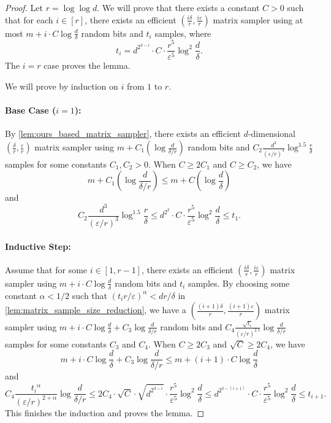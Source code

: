 \documentclass[10pt,a4paper]{article}
\newcommand{\eps}{\varepsilon}
\newcommand{\1}{\mathbbm{1}}
\newcommand{\tuple}[1]{\left(#1\right)}
\begin{document}
    \begin{proof}
    Let $r = \log\log d$.
    We will prove that there exists a constant $C > 0$ such that for each $i \in [r]$, there exists an efficient $\left( \frac{i \delta}{r}, \frac{i \varepsilon}{r}\right)$ matrix sampler using at most $m + i \cdot C \log\frac{d}{\delta}$ random bits and $t_i$ samples, where
    \[
        t_i = d^{2^{3-i}} \cdot C \cdot \frac{r^5}{\eps^5} \log^2\frac{d}{\delta}.
    \]
    The $i = r$ case proves the lemma. 

    We will prove by induction on $i$ from $1$ to $r$.
    \paragraph{Base Case ($i = 1$):}
    By \cref{lem:ours_based_matrix_sampler}, there exists an efficient $d$-dimensional $(\frac{\delta}{r}, \frac{\varepsilon}{r})$ matrix sampler using $m + C_1( \log\frac{d}{\delta/r})$ random bits and $C_2\frac{d^3}{(\eps/r)^3}\log^{1.5} \frac{r}{\delta}$ samples for some constants $C_1, C_2 > 0$. When $C \ge 2C_1$ and $C \ge C_2$, we have \[
        m + C_1\tuple{\log\frac{d}{\delta/r}} \le m + C\left( \log\frac{d}{\delta} \right)
    \]
         and
    \[
    C_2\frac{d^3}{(\eps/r)^3}\log^{1.5} \frac{r}{\delta} \le d^{2^{2}} \cdot C \cdot \frac{r^5}{\eps^5} \log^2\frac{d}{\delta} \le t_1.
    \]
 
    
    \paragraph{Inductive Step:}
    Assume that for some $i \in [1, r-1]$, there exists an efficient $\left( \frac{i \delta}{r}, \frac{i \varepsilon}{r}\right)$ matrix sampler using $m + i \cdot C\log\frac{d}{\delta}$ random bits and $t_i$ samples.
    By choosing some constant $\alpha < 1/2$ such that $(t_i r / \eps)^\alpha < d r / \delta$ in \cref{lem:matrix_sample_size_reduction}, we have a $\left( \frac{(i+1) \delta}{r}, \frac{(i+1) \varepsilon}{r}\right)$ matrix sampler using $m + i \cdot C\log\frac{d}{\delta} + C_3 \log \frac{d}{\delta/ r}$ random bits and $C_4\frac{\sqrt{t_i}}{(\eps / r)^{2.5}}\log\frac{d}{\delta / r}$ samples for some constants $C_3$ and $C_4$. When $C \ge 2C_3$ and $\sqrt{C} \ge 2C_4$, we have\[
        m + i \cdot C\log\frac{d}{\delta} + C_3 \log \frac{d}{\delta / r} \le m + (i + 1) \cdot C\log\frac{d}{\delta}
    \]
    and \[
        C_4\frac{{t_i}^\alpha}{(\eps / r)^{2+\alpha}}\log\frac{d}{\delta / r} \le 2 C_4 \cdot \sqrt{C} \cdot \sqrt{d^{2^{3-i}}} \cdot \frac{r^5}{\eps^5} \log^2\frac{d}{\delta} \le d^{2^{3-(i+1)}} \cdot C \cdot \frac{r^5}{\eps^5} \log^2\frac{d}{\delta} \le t_{i+1}.
    \]
    This finishes the induction and proves the lemma.
\end{proof}
\end{document}
